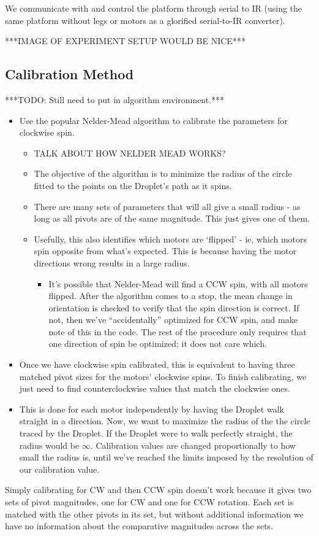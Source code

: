 \documentclass[letterpaper, 10pt, conference]{ieeeconf}
\begin{document}
We communicate with and control the platform through serial to IR (using the same platform without legs or motors as a glorified serial-to-IR converter). 

***IMAGE OF EXPERIMENT SETUP WOULD BE NICE***


\subsection{Calibration Method}
***TODO: Still need to put in algorithm environment.***
\begin{itemize}
\item Use the popular Nelder-Mead algorithm \cite{NelderMead} to calibrate the parameters for clockwise spin.
\begin{itemize}
\item TALK ABOUT HOW NELDER MEAD WORKS?
\item The objective of the algorithm is to minimize the radius of the circle fitted to the points on the Droplet's path as it spins.
\item There are many sets of parameters that will all give a small radius - as long as all pivots are of the same magnitude. This just gives one of them.
\item Usefully, this also identifies which motors are `flipped' - ie, which motors spin opposite from what's expected. This is because having the motor directions wrong results in a large radius.
\begin{itemize}
\item It's possible that Nelder-Mead will find a CCW spin, with all motors flipped. After the algorithm comes to a stop, the mean change in orientation is checked to verify that the spin direction is correct. If not, then we've ``accidentally'' optimized for CCW spin, and make note of this in the code. The rest of the procedure only requires that one direction of spin be optimized; it does not care which.
\end{itemize}
\end{itemize}
\item Once we have clockwise spin calibrated, this is equivalent to having three matched pivot sizes for the motors' clockwise spins. To finish calibrating, we just need to find counterclockwise values that match the clockwise ones.
\item This is done for each motor independently by having the Droplet walk straight in a direction. Now, we want to maximize the radius of the the circle traced by the Droplet. If the Droplet were to walk perfectly straight, the radius would be $\infty$. Calibration values are changed proportionally to how small the radius is, until we've reached the limits imposed by the resolution of our calibration value.
\end{itemize}
Simply calibrating for CW and then CCW spin doesn't work because it gives two sets of pivot magnitudes, one for CW and one for CCW rotation. Each set is matched with the other pivots in its set, but without additional information we have no information about the comparative magnitudes across the sets.
\end{document}
